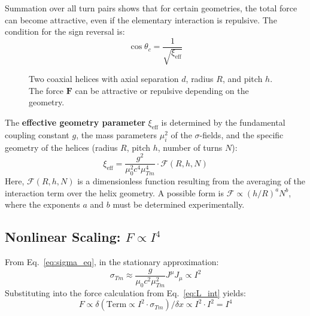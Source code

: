 \documentclass[10pt, a4paper]{article}
\begin{document}
	Summation over all turn pairs shows that for certain geometries, the total force can become attractive, even if the elementary interaction is repulsive. The condition for the sign reversal is:
	\begin{equation}
		\cos\theta_c = \frac{1}{\sqrt{\xi_{\text{eff}}}} \label{eq:critical_angle}
	\end{equation}
	
	\begin{figure}[h]
		\centering
		\caption{Two coaxial helices with axial separation $d$, radius $R$, and pitch $h$. The force $\mathbf{F}$ can be attractive or repulsive depending on the geometry.}
		\label{fig:helices}
	\end{figure}
	
	The \textbf{effective geometry parameter} $\xi_{\text{eff}}$ is determined by the fundamental coupling constant $g$, the mass parameters $\mu_i^2$ of the $\sigma$-fields, and the specific geometry of the helices (radius $R$, pitch $h$, number of turns $N$):
	\begin{equation}
		\xi_{\text{eff}} = \frac{g^2}{\mu_0^2 c^4 \mu_{Tm}^4} \cdot \mathcal{F}(R, h, N) \label{eq:xi_effective}
	\end{equation}
	Here, $\mathcal{F}(R, h, N)$ is a dimensionless function resulting from the averaging of the interaction term over the helix geometry. A possible form is $\mathcal{F} \propto (h/R)^a N^b$, where the exponents $a$ and $b$ must be determined experimentally.
	
	\subsection{Nonlinear Scaling: $F \propto I^4$}
	From Eq.~\ref{eq:sigma_eq}, in the stationary approximation:
	\begin{equation}
		\sigma_{Tm} \approx \frac{g}{\mu_0 c^2 \mu_{Tm}^2} J^\mu J_\mu \propto I^2
	\end{equation}
	Substituting into the force calculation from Eq.~\ref{eq:L_int} yields:
	\begin{equation}
		F \propto \delta\left(\text{Term} \propto I^2 \cdot \sigma_{Tm}\right)/\delta x \propto I^2 \cdot I^2 = I^4 \label{eq:I4_scaling}
	\end{equation}
	
\end{document}
